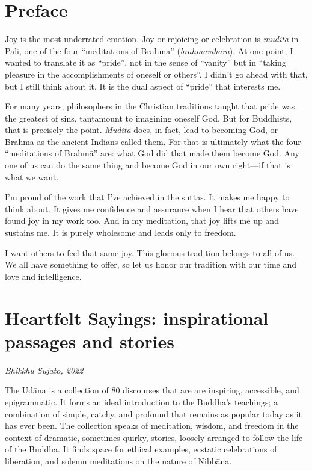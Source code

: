 \documentclass[12pt,openany]{book}%
\newcommand*{\scbyline}[1]{\begin{flushright}\textit{#1}\end{flushright}\bigskip}
\begin{document}
%
\chapter*{Preface}

Joy is the most underrated emotion. Joy or rejoicing or celebration is \textit{\textsanskrit{muditā}} in Pali, one of the four “meditations of \textsanskrit{Brahmā}” (\textit{\textsanskrit{brahmavihāra}}). At one point, I wanted to translate it as “pride”, not in the sense of “vanity” but in “taking pleasure in the accomplishments of oneself or others”. I didn’t go ahead with that, but I still think about it. It is the dual aspect of “pride” that interests me.

For many years, philosophers in the Christian traditions taught that pride was the greatest of sins, tantamount to imagining oneself God. But for Buddhists, that is precisely the point. \textit{\textsanskrit{Muditā}} does, in fact, lead to becoming God, or \textsanskrit{Brahmā} as the ancient Indians called them. For that is ultimately what the four “meditations of \textsanskrit{Brahmā}” are: what God did that made them become God. Any one of us can do the same thing and become God in our own right—if that is what we want.

I’m proud of the work that I’ve achieved in the suttas. It makes me happy to think about. It gives me confidence and assurance when I hear that others have found joy in my work too. And in my meditation, that joy lifts me up and sustains me. It is purely wholesome and leads only to freedom.

I want others to feel that same joy. This glorious tradition belongs to all of us. We all have something to offer, so let us honor our tradition with our time and love and intelligence.

%
\chapter*{Heartfelt Sayings: inspirational passages and stories}

\scbyline{Bhikkhu Sujato, 2022}

The \textsanskrit{Udāna} is a collection of 80 discourses that are are inspiring, accessible, and epigrammatic. It forms an ideal introduction to the Buddha’s teachings; a combination of simple, catchy, and profound that remains as popular today as it has ever been. The collection speaks of meditation, wisdom, and freedom in the context of dramatic, sometimes quirky, stories, loosely arranged to follow the life of the Buddha. It finds space for ethical examples, ecstatic celebrations of liberation, and solemn meditations on the nature of \textsanskrit{Nibbāna}.
\end{document}
